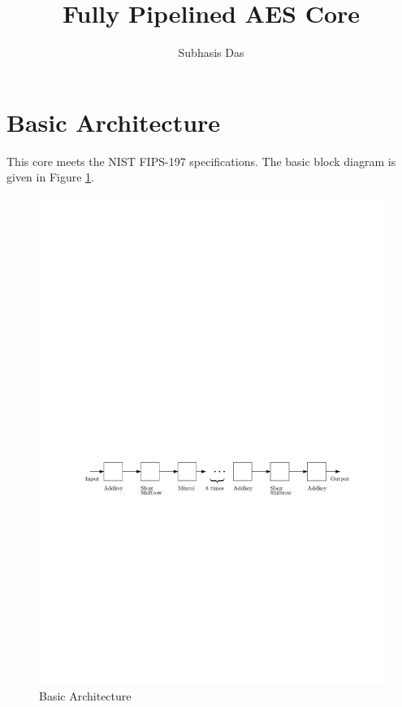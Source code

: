 \documentclass[a4paper]{article}
\title{Fully Pipelined AES Core}
\author{Subhasis Das}
\date{}
\begin{document}
\maketitle
\section*{Basic Architecture}
This core meets the NIST FIPS-197 specifications. The basic block diagram is given in Figure \ref{arch}.
\begin{figure}[h]
\centering
\includegraphics[scale=0.7]{arch}
\caption{Basic Architecture}
\label{arch}
\end{figure}
\end{document}
